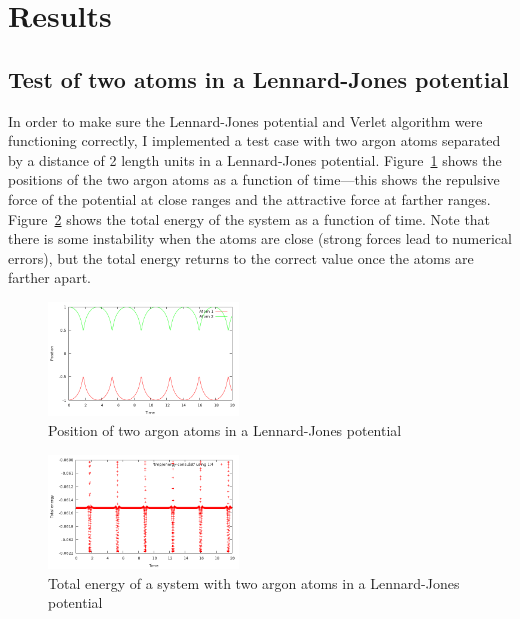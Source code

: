 \documentclass[twocolumn]{revtex4}
\begin{document}
\section{Results}

\subsection{Test of two atoms in a Lennard-Jones potential}

In order to make sure the Lennard-Jones potential and Verlet algorithm were functioning correctly, I implemented a test case with two argon atoms separated by a distance of 2 length units in a Lennard-Jones potential. Figure~\ref{fig:lj-pos} shows the positions of the two argon atoms as a function of time---this shows the repulsive force of the potential at close ranges and the attractive force at farther ranges. Figure~\ref{fig:energy-cons} shows the total energy of the system as a function of time. Note that there is some instability when the atoms are close (strong forces lead to numerical errors), but the total energy returns to the correct value once the atoms are farther apart.

\begin{figure}[htb]
\begin{center}
\leavevmode
\includegraphics[width=0.45\textwidth]{lj-pos.png}
\end{center}
\caption{Position of two argon atoms in a Lennard-Jones potential}
\label{fig:lj-pos}
\end{figure}

\begin{figure}[htb]
\begin{center}
\leavevmode
\includegraphics[width=0.45\textwidth]{energy-cons.png}
\end{center}
\caption{Total energy of a system with two argon atoms in a Lennard-Jones potential}
\label{fig:energy-cons}
\end{figure}
\end{document}
